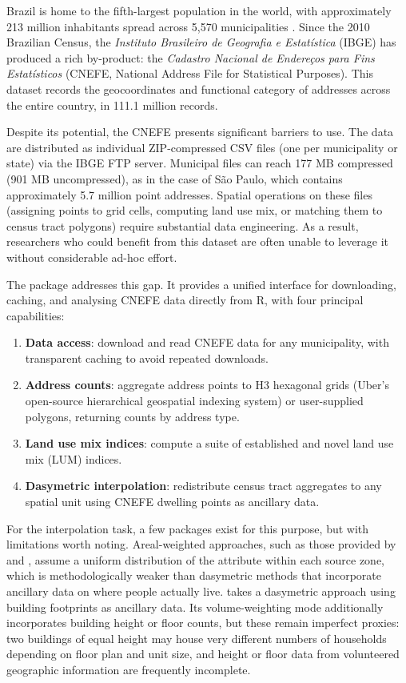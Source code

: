 Brazil is home to the fifth-largest population in the world, with
approximately 213 million inhabitants spread across 5,570 municipalities
\citep{ibge2026}. Since the 2010 Brazilian Census, the \emph{Instituto
Brasileiro de Geografia e Estatística} (IBGE) has produced a rich
by-product: the \emph{Cadastro Nacional de Endereços para Fins Estatísticos}
(CNEFE, National Address File for Statistical Purposes). This dataset
records the geocoordinates and functional category of addresses across
the entire country, in 111.1 million records.

Despite its potential, the CNEFE presents significant barriers to use.
The data are distributed as individual ZIP-compressed CSV files (one per
municipality or state) via the IBGE FTP server. Municipal files can
reach 177 MB compressed (901 MB uncompressed), as in the case of São
Paulo, which contains approximately 5.7 million point addresses. Spatial
operations on these files (assigning points to grid cells, computing
land use mix, or matching them to census tract polygons) require
substantial data engineering. As a result, researchers who could benefit
from this dataset are often unable to leverage it without considerable
ad-hoc effort.

The  package addresses this gap. It provides a
unified interface for downloading, caching, and analysing CNEFE data
directly from R, with four principal capabilities:

\begin{enumerate}
\def\labelenumi{\arabic{enumi}.}
\tightlist
\item
  \textbf{Data access}: download and read CNEFE data for any municipality,
  with transparent caching to avoid repeated downloads.
\item
  \textbf{Address counts}: aggregate address points to H3 hexagonal grids
  (Uber's open-source hierarchical geospatial indexing system) or
  user-supplied polygons, returning counts by address type.
\item
  \textbf{Land use mix indices}: compute a suite of established and
  novel land use mix (LUM) indices.
\item
  \textbf{Dasymetric interpolation}: redistribute census tract aggregates
  to any spatial unit using CNEFE dwelling points as ancillary data.
\end{enumerate}

For the interpolation task, a few packages exist for this purpose, but
with limitations worth noting. Areal-weighted approaches, such as those
provided by  \citep{pebesma2018} and 
\citep{prener2019}, assume a uniform distribution of the attribute within
each source zone, which is methodologically weaker than dasymetric
methods that incorporate ancillary data on where people actually live.
 \citep{batsaris2023} takes a dasymetric approach using
building footprints as ancillary data. Its volume-weighting mode
additionally incorporates building height or floor counts, but these
remain imperfect proxies: two buildings of equal height may house very
different numbers of households depending on floor plan and unit size,
and height or floor data from volunteered geographic information are
frequently incomplete.

